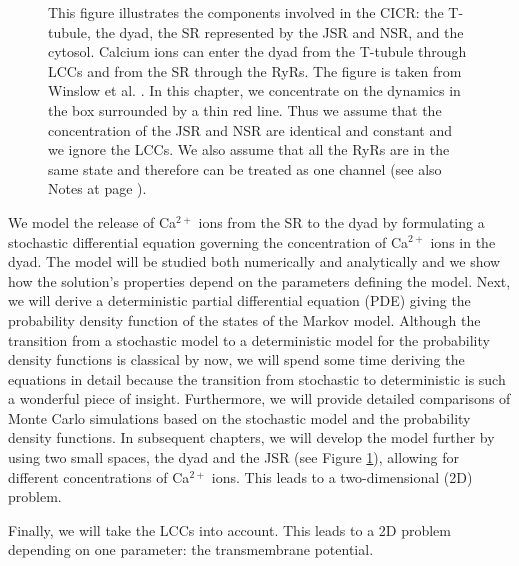 \begin{figure}
\centering{}
\caption{This figure illustrates the components involved in the CICR: the T-tubule, the dyad, the SR represented by the JSR and NSR, and the cytosol.
Calcium ions can enter the dyad from the T-tubule through LCCs and from the SR through the RyRs. The figure is taken from Winslow et al. \cite{winslow2006}. In this chapter, we concentrate on the dynamics in the box surrounded by a thin red line. Thus we assume that the concentration of the JSR and NSR are identical and constant and we ignore the LCCs. We also assume that all the RyRs are in the same state and therefore can be treated as one channel (see also Notes at page \pageref{notes_Ca_1D}).
\label{cicr_1D}}
\end{figure}

We model the release of Ca$^{2+}$ ions from the SR to the dyad by formulating a stochastic differential equation governing the concentration of Ca$^{2+}$ ions in the dyad. The model will be studied both numerically and analytically and we show how the solution's properties depend on the parameters defining the model. Next, we will derive a deterministic partial differential equation (PDE) giving the probability density function of the states of the Markov model. Although the transition from a stochastic model to a deterministic model for the probability density functions is classical by now, we will spend some time deriving the equations in detail because the transition from stochastic to deterministic is such a wonderful piece of insight. Furthermore, we will provide detailed comparisons of Monte Carlo simulations based on the stochastic model and the probability density functions.
In subsequent chapters, we will develop the model further by using two small spaces, the dyad and the JSR (see Figure \ref{cicr_1D}),  allowing for different concentrations of Ca$^{2+}$ ions. This leads to a two-dimensional (2D) problem. 

Finally, we will take the LCCs into account. This leads to a 2D problem depending on one parameter: the transmembrane potential.

